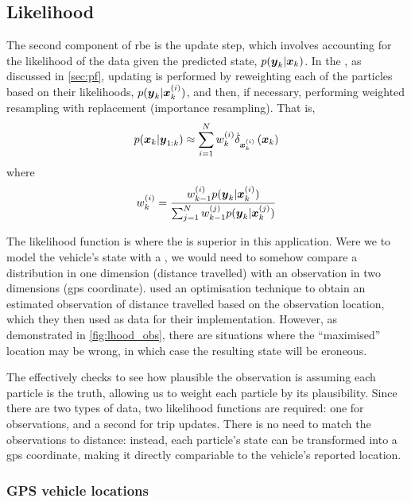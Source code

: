 \subsection{Likelihood}
\label{sec:pf-likelihood}

The second component of \gls{rbe} is the update step, which involves accounting for the likelihood of the data given the predicted state, $p(\boldsymbol{y}_k | \boldsymbol x_k)$. In the \pf{}, as discussed in \cref{sec:pf}, updating is performed by reweighting each of the particles based on their likelihoods, $p(\boldsymbol{y}_k | \boldsymbol x^{(i)}_k)$, and then, if necessary, performing weighted resampling with replacement (importance resampling). That is,
\begin{equation}
\label{eq:vehicle_pf_update}
p(\Vstate_k | \Vobs_{1:k}) \approx
\sum_{i=1}^\Np
    \Pwt_{k}
    \DiracMeasure{\Vstate\vi_k}{\Vstate_k}
\end{equation}
where
\begin{equation}
\label{eq:vehicle_pf_reweight}
\Pwt_k = \frac{
    \Pwt_{k-1} p(\Vobs_k | \Vstate\vi_k)
}{
    \sum_{j=1}^\Np \Pwt[j]_{k-1} p(\Vobs_k | \Vstate\vi[j]_k)
}
\end{equation}


The likelihood function is where the \pf{} is superior in this application. Were we to model the vehicle's state with a \kf{}, we would need to somehow compare a distribution in one dimension (distance travelled) with an observation in two dimensions (\gls{gps} coordinate). \cite{Cathey_2003} used an optimisation technique to obtain an estimated observation of distance travelled based on the observation location, which they then used as data for their \kf{} implementation. However, as demonstrated in \cref{fig:lhood_obs}, there are situations where the ``maximised'' location may be wrong, in which case the resulting state will be eroneous.


The \pf{} effectively checks to see how plausible the observation is assuming each particle is the truth, allowing us to weight each particle by its plausibility. Since there are two types of data, two likelihood functions are required: one for \GPS{} observations, and a second for trip updates. There is no need to match the observations to distance: instead, each particle's state can be transformed into a \gls{gps} coordinate, making it directly compariable to the vehicle's reported location.


\subsubsection{GPS vehicle locations}
\label{sec:lhood_gps}

